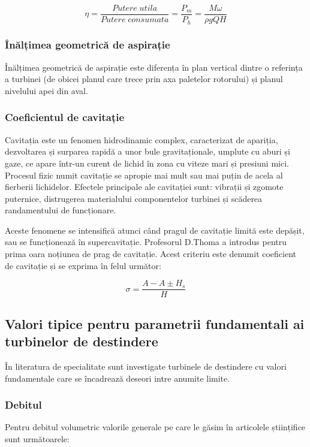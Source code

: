 \begin{equation}
{\eta}=\frac{Putere\; utila}{Putere\; consumata}=\frac{P_m}{P_h}=\frac{M{\omega}}{{\rho}gQH}
\end{equation}


\subsubsection{Înălțimea geometrică de aspirație}

Înălțimea geometrică de aspirație este diferența în plan vertical dintre o referința a turbinei (de obicei planul care trece prin axa paletelor rotorului) și planul nivelului apei din aval.

\subsubsection{Coeficientul de cavitație}

Cavitația este un fenomen hidrodinamic complex, caracterizat de apariția, dezvoltarea și surparea rapidă a unor bule gravitaționale, umplute cu aburi și gaze, ce apare într-un curent de lichid în zona cu viteze mari și presiuni mici. Procesul fizic numit cavitație se apropie mai mult sau mai puțin de acela al fierberii lichidelor. Efectele principale ale cavitației sunt: vibrații și zgomote puternice, distrugerea materialului componentelor turbinei și scăderea randamentului de funcționare.

Aceste fenomene se intensifică atunci când pragul de cavitație limită este depășit, sau se funcționează în supercavitație. Profesorul D.Thoma a introdus pentru prima oara noțiunea de prag de cavitație. Acest criteriu este denumit coeficient de cavitație și se exprima în felul următor:

\begin{equation}
\sigma=\frac{A-A\pm{H_s}}{H}
\end{equation}


\subsection{Valori tipice pentru parametrii fundamentali ai turbinelor de destindere}

În literatura de specialitate sunt investigate turbinele de destindere cu valori fundamentale care se încadrează deseori intre anumite limite.


\subsubsection{Debitul}
Pentru debitul volumetric valorile generale pe care le găsim în articolele științifice sunt următoarele:

